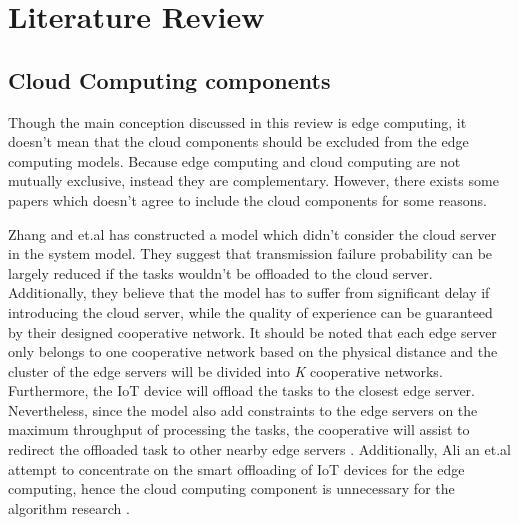 \documentclass[a4paper,11pt]{article}
\begin{document}






\section{Literature Review}
\subsection{Cloud Computing components}
Though the main conception discussed in this review is edge computing, it doesn't mean that the cloud components should be excluded from the edge computing models. Because edge computing and cloud computing are not mutually exclusive, instead they are complementary. However, there exists some papers which doesn't agree to include the cloud components for some reasons.\newline




Zhang and et.al has constructed a model which didn't consider the cloud server in the system model. They suggest that transmission failure probability can be largely reduced if the tasks wouldn't be offloaded to the cloud server. Additionally, they believe that the model has to suffer from significant delay if introducing the cloud server, while the quality of experience can be guaranteed by their designed cooperative network. It should be noted that each edge server only belongs to one cooperative network based on the physical distance and the cluster of the edge servers will be divided into \textit{K} cooperative networks. Furthermore, the IoT device will offload the tasks to the closest edge server. Nevertheless, since the model also add constraints to the edge servers on the maximum throughput of processing the tasks, the cooperative will assist to redirect the offloaded task to other nearby edge servers \cite{no_cloud_1_density}. Additionally, Ali an et.al attempt to concentrate on the smart offloading of IoT devices for the edge computing, hence the cloud computing component is unnecessary for the algorithm research \cite{granuity_2}.\newline %
\end{document}
